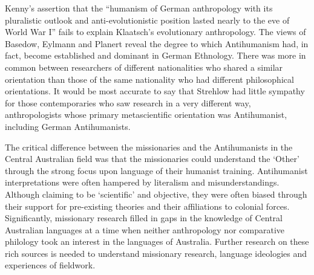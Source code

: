 \documentclass[output=paper]{../langscibook}
\begin{document}
Kenny’s assertion that the ``humanism of German anthropology with its pluralistic outlook and anti-evolutionistic position lasted nearly to the eve of World War I'' fails to explain Klaatsch’s evolutionary anthropology. The views of Basedow, Eylmann and Planert reveal the degree to which Antihumanism had, in fact, become established and dominant in German Ethnology. There was more in common between researchers of different nationalities who shared a similar orientation than those of the same nationality who had different philosophical orientations.  It would be most accurate to say that Strehlow had little sympathy for those contemporaries who saw research in a very different way, anthropologists whose primary metascientific orientation was Antihumanist, including German Antihumanists. 

The critical difference between the missionaries and the Antihumanists in the Central Australian field was that the missionaries could understand the ‘Other’ through the strong focus upon language of their humanist training. Antihumanist interpretations were often hampered by literalism and misunderstandings. Although claiming to be ‘scientific’ and objective, they were often biased through their support for pre-existing theories and their affiliations to colonial forces. Significantly, missionary research filled in gaps in the knowledge of Central Australian languages at a time when neither anthropology nor comparative philology took an interest in the languages of Australia. Further research on these rich sources is needed to understand missionary research, language ideologies and experiences of fieldwork. 




{\sloppy\printbibliography[heading=subbibliography,notkeyword=this]}
\end{document}
